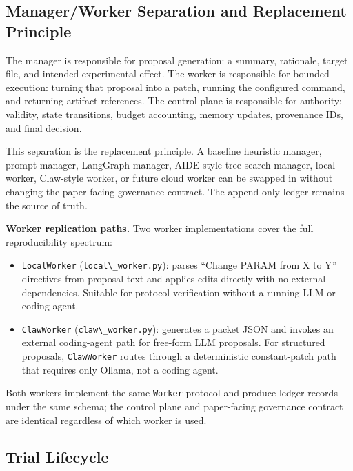\subsection{Manager/Worker Separation and Replacement Principle}\label{managerworker-separation-and-replacement-principle}

The manager is responsible for proposal generation: a summary, rationale, target file, and intended experimental effect. The worker is responsible for bounded execution: turning that proposal into a patch, running the configured command, and returning artifact references. The control plane is responsible for authority: validity, state transitions, budget accounting, memory updates, provenance IDs, and final decision.

This separation is the replacement principle. A baseline heuristic manager, prompt manager, LangGraph manager, AIDE-style tree-search manager, local worker, Claw-style worker, or future cloud worker can be swapped in without changing the paper-facing governance contract. The append-only ledger remains the source of truth.

\textbf{Worker replication paths.} Two worker implementations cover the full reproducibility spectrum:

\begin{itemize}
\tightlist
\item
  \passthrough{\lstinline!LocalWorker!} (\passthrough{\lstinline!local\_worker.py!}): parses ``Change PARAM from X to Y'' directives from proposal text and applies edits directly with no external dependencies. Suitable for protocol verification without a running LLM or coding agent.
\item
  \passthrough{\lstinline!ClawWorker!} (\passthrough{\lstinline!claw\_worker.py!}): generates a packet JSON and invokes an external coding-agent path for free-form LLM proposals. For structured proposals, \passthrough{\lstinline!ClawWorker!} routes through a deterministic constant-patch path that requires only Ollama, not a coding agent.
\end{itemize}

Both workers implement the same \passthrough{\lstinline!Worker!} protocol and produce ledger records under the same schema; the control plane and paper-facing governance contract are identical regardless of which worker is used.

\subsection{Trial Lifecycle}\label{trial-lifecycle}

